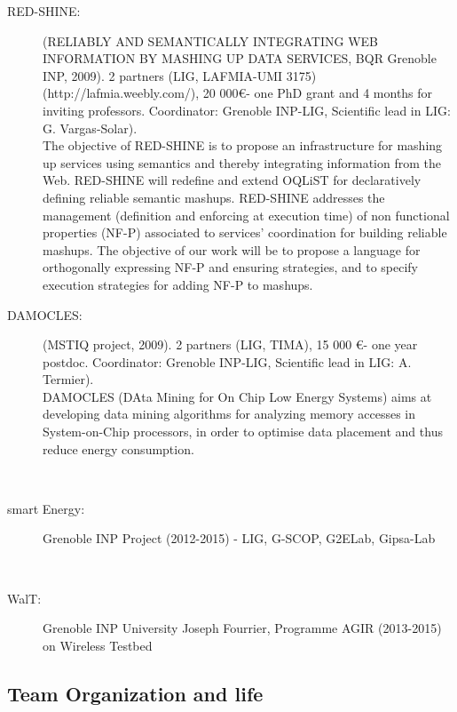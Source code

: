  \begin{description}


\item[RED-SHINE:] (RELIABLY AND SEMANTICALLY INTEGRATING WEB INFORMATION BY MASHING UP DATA SERVICES, BQR Grenoble INP, 2009). 2 partners (LIG, LAFMIA-UMI 3175)  (http://lafmia.weebly.com/), 20 000\euro - one PhD grant and 4 months for inviting professors. Coordinator: Grenoble INP-LIG, Scientific lead in LIG: G. Vargas-Solar). \\
The objective of RED-SHINE is to propose an infrastructure for mashing up services using semantics and thereby integrating information from the Web. RED-SHINE will redefine and extend OQLiST for declaratively defining reliable semantic mashups. RED-SHINE addresses the management (definition and enforcing at execution time) of non functional properties (NF-P) associated to services' coordination for building reliable mashups. The objective of our work will be to propose a language for orthogonally expressing NF-P and ensuring strategies, and to specify execution strategies for adding NF-P to mashups.\\

\item[DAMOCLES:] (MSTIQ project, 2009). 2 partners (LIG, TIMA), 15 000 \euro - one year postdoc. Coordinator: Grenoble INP-LIG, Scientific lead in LIG: A. Termier). \\
DAMOCLES (DAta Mining for On Chip Low Energy Systems) aims at developing data mining algorithms for analyzing memory accesses in System-on-Chip processors, in order to optimise data placement and thus reduce energy consumption.

\ \\
\item[smart Energy:] 

Grenoble INP Project (2012-2015) - LIG, G-SCOP, G2ELab, Gipsa-Lab

\ \\

\item[WalT:] 
Grenoble INP   University  Joseph Fourrier, Programme AGIR (2013-2015) on Wireless Testbed
	
 \end{description}






\subsection{Team Organization and life} %
\label{sub:hadas_team_organization_and_life}%

